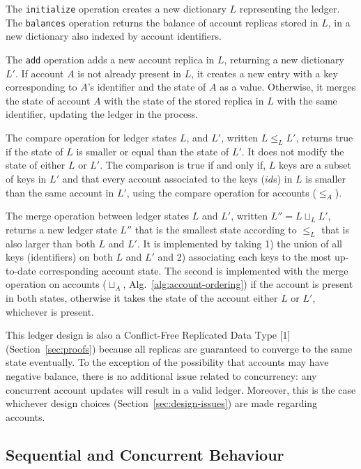 \documentclass[9pt, oneside]{article}   	%
\begin{document}
The \texttt{initialize} operation creates a new dictionary $L$ representing the ledger. The \texttt{balances} operation returns the balance of account replicas stored in $L$, in a new dictionary also indexed by account identifiers. 

The \texttt{add} operation adds a new account replica in $L$, returning a new dictionary $L'$. If account $A$ is not already present in $L$, it creates a new entry with a key corresponding to $A$'s identifier and the state of $A$ as a value. Otherwise, it merges the state of account $A$ with the state of the stored replica in $L$ with the same identifier, updating the ledger in the process.

The compare operation for ledger states $L$, and $L'$, written $L \leq_L L'$, returns true if the state of $L$ is smaller or equal than the state of $L'$. It does not modify the state of either $L$ or $L'$. The comparison is true if and only if, $L$ keys are a subset of keys in $L'$ and that every account associated to the keys ($id$s) in $L$ is smaller than the same account in $L'$, using the compare operation for accounts ($\leq_A$).

The merge operation between ledger states $L$ and $L'$, written $L'' = L \sqcup_L L'$, returns a new ledger state $L''$ that is the smallest state according to $\leq_L$ that is also larger than both $L$ and $L'$. It is implemented by taking 1) the union of all keys (identifiers) on both $L$ and $L'$ and 2) associating each keys to the most up-to-date corresponding account state. The second is implemented with the merge operation on accounts ($\sqcup_A$, Alg.~\ref{alg:account-ordering}) if the account is present in both states, otherwise it takes the state of the account either $L$ or $L'$, whichever is present.


This ledger design is also a Conflict-Free Replicated Data Type [1] (Section~\ref{sec:proofs}) because all replicas are guaranteed to converge to the same state eventually. To the exception of the possibility that accounts may have negative balance, there is no additional issue related to concurrency: any concurrent account updates will result in a valid ledger. Moreover, this is the case whichever design choices (Section~\ref{sec:design-issues}) are made regarding accounts.

\subsection{Sequential and Concurrent Behaviour}
\end{document}
